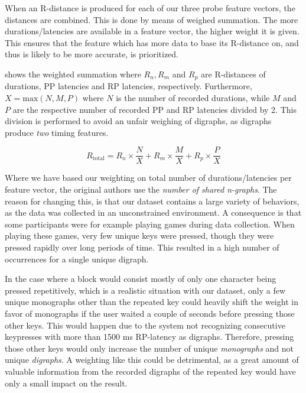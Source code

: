 When an R-distance is produced for each of our three probe feature vectors, the distances are combined.
This is done by means of weighed summation.
The more durations/latencies are available in a feature vector, the higher weight it is given.
This ensures that the feature which has more data to base its R-distance on, and thus is likely to be more accurate, is prioritized.

 shows the weighted summation where $R_n, R_m$ and $R_p$ are R-distances of durations, PP latencies and RP latencies, respectively.
Furthermore, $X = \text{max}(N, M, P)$ where $N$ is the number of recorded durations, while $M$ and $P$ are the respective number of recorded PP and RP latencies divided by 2.
This division is performed to avoid an unfair weighing of digraphs, as digraphs produce \textit{two} timing features.

\begin{equation}
\label{eq:R-combination}
    R_{\text{total}} = R_n \times \frac{N}{X} + R_m \times \frac{M}{X} + R_p \times \frac{P}{X}
\end{equation}

Where we have based our weighting on total number of durations/latencies per feature vector, the original authors use the \textit{number of shared n-graphs}.
The reason for changing this, is that our dataset contains a large variety of behaviors, as the data was collected in an unconstrained environment.
A consequence is that some participants were for example playing games during data collection.
When playing these games, very few unique keys were pressed, though they were pressed rapidly over long periods of time. 
This resulted in a high number of occurrences for a single unique digraph.

In the case where a block would consist mostly of only one character being pressed repetitively, which is a realistic situation with our dataset, only a few unique monographs other than the repeated key could heavily shift the weight in favor of monographs if the user waited a couple of seconds before pressing those other keys.
This would happen due to the system not recognizing consecutive keypresses with more than 1500 ms RP-latency as digraphs.
Therefore, pressing those other keys would only increase the number of unique \textit{monographs} and not unique \textit{digraphs}.
A weighting like this could be detrimental, as a great amount of valuable information from the recorded digraphs of the repeated key would have only a small impact on the result.

